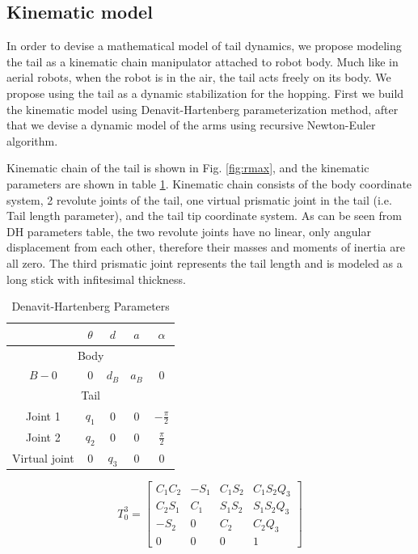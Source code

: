 \subsection{Kinematic model}
In order to devise a mathematical model of tail dynamics, we propose modeling the tail as a kinematic chain manipulator attached to robot body. Much like in aerial robots, when the robot is in the air, the tail acts freely on its body. We propose using the tail as a dynamic stabilization for the hopping. First we build the kinematic model using Denavit-Hartenberg parameterization method, after that we devise a dynamic model of the arms using recursive Newton-Euler algorithm.

Kinematic chain of the tail is shown in Fig. \ref{fig:rmax}, and the kinematic parameters are shown in table \ref{tab:DHParameters}. Kinematic chain consists of the body coordinate system, 2 revolute joints  of the tail, one virtual prismatic joint in the tail (i.e. Tail length parameter), and the tail tip coordinate system. As can be seen from DH parameters table, the two revolute joints have no linear, only angular displacement from each other, therefore their masses and moments of inertia are all zero. The third prismatic joint represents the tail length and is modeled as a long stick with infitesimal thickness. 

\begin{table}
	\centering
		\begin{tabular}{ccccc}
		\hline
			& $\theta$ & $d$ & $a$ & $\alpha$ \\\hline
			\multicolumn{5}{c}{Body}\\\hline
			$B-0$ & $0$ & $d_B$ & $a_B$ & $0$\\\hline
			\multicolumn{5}{c}{Tail}\\\hline
			Joint 1 & $q_1$ & $0$ & $0$ & $-\frac{\pi}{2}$\\
			Joint 2 & $q_2$ & $0$ & $0$ & $\frac{\pi}{2}$\\
			Virtual joint& $0$ & $q_3$ & $0$ & $0$\\\hline
		\end{tabular}
	\caption{Denavit-Hartenberg Parameters}\label{tab:DHParameters}
\end{table}

\begin{equation}
T_0^3=\begin{bmatrix}
C_1 C_2 & -S_1 & C_1 S_2 & C_1 S_2 Q_3 \\
C_2 S_1 & C_1 & S_1 S_2 & S_1 S_2 Q_3 \\
-S_2 & 0 & C_2 & C_2 Q_3 \\
 0 & 0 & 0 & 1
\end{bmatrix}
\end{equation}


